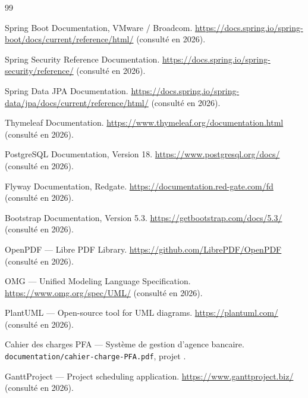 \begin{thebibliography}{99}

Spring Boot Documentation, VMware / Broadcom.
\url{https://docs.spring.io/spring-boot/docs/current/reference/html/} (consulté en 2026).

Spring Security Reference Documentation.
\url{https://docs.spring.io/spring-security/reference/} (consulté en 2026).

Spring Data JPA Documentation.
\url{https://docs.spring.io/spring-data/jpa/docs/current/reference/html/} (consulté en 2026).

Thymeleaf Documentation.
\url{https://www.thymeleaf.org/documentation.html} (consulté en 2026).

PostgreSQL Documentation, Version 18.
\url{https://www.postgresql.org/docs/} (consulté en 2026).

Flyway Documentation, Redgate.
\url{https://documentation.red-gate.com/fd} (consulté en 2026).

Bootstrap Documentation, Version 5.3.
\url{https://getbootstrap.com/docs/5.3/} (consulté en 2026).

OpenPDF — Libre PDF Library.
\url{https://github.com/LibrePDF/OpenPDF} (consulté en 2026).

OMG — Unified Modeling Language Specification.
\url{https://www.omg.org/spec/UML/} (consulté en 2026).

PlantUML — Open-source tool for UML diagrams.
\url{https://plantuml.com/} (consulté en 2026).

Cahier des charges PFA — Système de gestion d'agence bancaire.
\texttt{documentation/cahier-charge-PFA.pdf}, projet \nomapplication.

GanttProject — Project scheduling application.
\url{https://www.ganttproject.biz/} (consulté en 2026).

\end{thebibliography}
